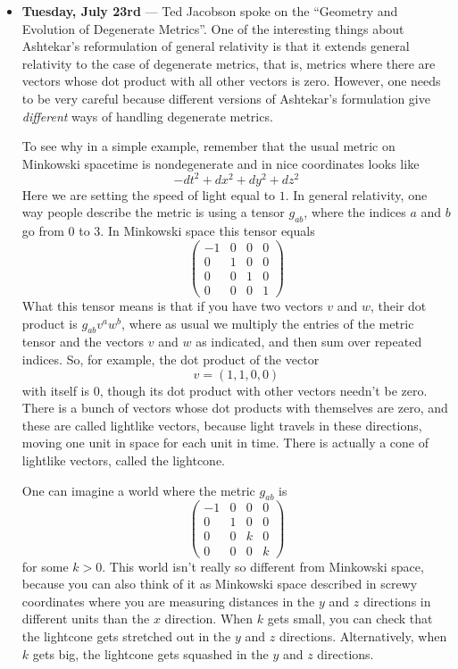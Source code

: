 \documentclass{article}
\begin{document}
\begin{itemize}
\item
  \textbf{Tuesday, July 23rd} --- Ted Jacobson spoke on the ``Geometry
  and Evolution of Degenerate Metrics''. One of the interesting things
  about Ashtekar's reformulation of general relativity is that it
  extends general relativity to the case of degenerate metrics, that is,
  metrics where there are vectors whose dot product with all other
  vectors is zero. However, one needs to be very careful because
  different versions of Ashtekar's formulation give \emph{different}
  ways of handling degenerate metrics.

  To see why in a simple example, remember that the usual metric on
  Minkowski spacetime is nondegenerate and in nice coordinates looks
  like \[-dt^2 + dx^2 + dy^2 + dz^2\] Here we are setting the speed of
  light equal to \(1\). In general relativity, one way people describe
  the metric is using a tensor \(g_{ab}\), where the indices \(a\) and
  \(b\) go from 0 to 3. In Minkowski space this tensor equals \[
      \left(
        \begin{array}{cccc}
          -1&0&0&0
        \\0&1&0&0
        \\0&0&1&0
        \\0&0&0&1
        \end{array}
      \right)
    \] What this tensor means is that if you have two vectors \(v\) and
  \(w\), their dot product is \(g_{ab} v^a w^b\), where as usual we
  multiply the entries of the metric tensor and the vectors \(v\) and
  \(w\) as indicated, and then sum over repeated indices. So, for
  example, the dot product of the vector \[v = (1, 1, 0, 0)\] with
  itself is \(0\), though its dot product with other vectors needn't be
  zero. There is a bunch of vectors whose dot products with themselves
  are zero, and these are called lightlike vectors, because light
  travels in these directions, moving one unit in space for each unit in
  time. There is actually a cone of lightlike vectors, called the
  lightcone.

  One can imagine a world where the metric \(g_{ab}\) is \[
      \left(
        \begin{array}{cccc}
          -1&0&0&0
        \\0&1&0&0
        \\0&0&k&0
        \\0&0&0&k
        \end{array}
      \right)
    \] for some \(k > 0\). This world isn't really so different from
  Minkowski space, because you can also think of it as Minkowski space
  described in screwy coordinates where you are measuring distances in
  the \(y\) and \(z\) directions in different units than the \(x\)
  direction. When \(k\) gets small, you can check that the lightcone
  gets stretched out in the \(y\) and \(z\) directions. Alternatively,
  when \(k\) gets big, the lightcone gets squashed in the \(y\) and
  \(z\) directions.


\end{itemize}
\end{document}
